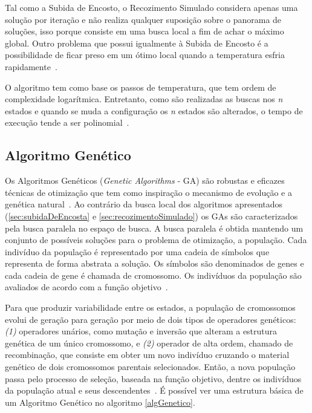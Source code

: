 Tal como a Subida de Encosto, o Recozimento Simulado considera apenas uma solução por iteração e não realiza qualquer suposição sobre o panorama de soluções, isso porque consiste em uma busca local a fim de achar o máximo global. Outro problema que possui igualmente à Subida de Encosto é a possibilidade de ficar preso em um ótimo local quando a temperatura esfria rapidamente~\cite{youssef2001167}.

O algoritmo tem como base os passos de temperatura, que tem ordem de complexidade logarítmica. Entretanto, como são realizadas as buscas nos \textit{n} estados e quando se muda a configuração os \textit{n} estados são alterados, o tempo de execução tende a ser polinomial~\cite{kirkpatrick1983optimization}.

\subsection{Algoritmo Genético}

Os Algoritmos Genéticos (\textit{Genetic Algorithms} - GA) são robustas e eficazes técnicas de otimização que tem como inspiração o mecanismo de evolução e a genética natural~\cite{holland1989genetic}. Ao contrário da busca local dos algoritmos apresentados (\ref{sec:subidaDeEncosta} e \ref{sec:recozimentoSimulado}) os GAs são caracterizados pela busca paralela no espaço de busca. A busca paralela é obtida mantendo um conjunto de possíveis soluções para o problema de otimização, a população. Cada indivíduo da população é representado por uma cadeia de símbolos que representa de forma abstrata a solução. Os símbolos são denominados de genes e cada cadeia de gene é chamada de cromossomo. Os indivíduos da população são avaliados de acordo com a função objetivo~\cite{youssef2001167}. 

Para que produzir variabilidade entre os estados, a população de cromossomos evolui de geração para geração por meio de dois tipos de operadores genéticos: \textit{(1)} operadores unários, como mutação e inversão que  alteram a estrutura genética de um único cromossomo, e \textit{(2)} operador de alta ordem, chamado de recombinação, que consiste em obter um novo indivíduo cruzando o material genético de dois cromossomos parentais selecionados. Então, a nova população passa pelo processo de seleção, baseada na função objetivo, dentre os indivíduos da população atual e seus descendentes~\cite{youssef2001167}. É possível ver uma estrutura básica de um Algoritmo Genético no algoritmo \ref{algGenetico}.

